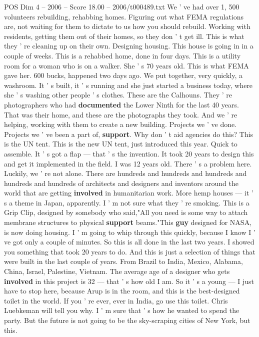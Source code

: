 \begin{textsample}{POS Dim 4 – 2006 – Score 18.00 – 2006/t000489.txt}
We ' ve had over 1, 500 volunteers rebuilding, rehabbing homes.
Figuring out what FEMA regulations are, not waiting for them to dictate to us how you should rebuild.
Working with residents, getting them out of their homes, so they don ' t get ill.
This is what they ' re cleaning up on their own.
Designing housing.
This house is going in in a couple of weeks.
This is a rehabbed home, done in four days.
This is a utility room for a woman who is on a walker.
She ' s 70 years old.
This is what FEMA gave her. 600 bucks, happened two days ago.
We put together, very quickly, a washroom.
It ' s built, it ' s running and she just started a business today, where she ' s washing other people ' s clothes.
These are the Calhouns.
They ' re photographers who had \textbf{documented} the Lower Ninth for the last 40 years.
That was their home, and these are the photographs they took.
And we ' re helping, working with them to create a new building.
Projects we ' ve done.
Projects we ' ve been a part of, \textbf{support}.
Why don ' t aid agencies do this?
This is the UN tent.
This is the new UN tent, just introduced this year.
Quick to assemble.
It ' s got a flap — that ' s the invention.
It took 20 years to design this and get it implemented in the field.
I was 12 years old.
There ' s a problem here.
Luckily, we ' re not alone.
There are hundreds and hundreds and hundreds and hundreds and hundreds of architects and designers and inventors around the world that are getting \textbf{involved} in humanitarian work.
More hemp houses — it ' s a theme in Japan, apparently.
I ' m not sure what they ' re smoking.
This is a Grip Clip, designed by somebody who said,"All you need is some way to attach membrane structures to physical \textbf{support} beams."This \textbf{guy} designed for NASA, is now doing housing.
I ' m going to whip through this quickly, because I know I ' ve got only a couple of minutes.
So this is all done in the last two years.
I showed you something that took 20 years to do.
And this is just a selection of things that were built in the last couple of years.
From Brazil to India, Mexico, Alabama, China, Israel, Palestine, Vietnam.
The average age of a designer who gets \textbf{involved} in this project is 32 — that ' s how old I am.
So it ' s a young — I just have to stop here, because Arup is in the room, and this is the best-designed toilet in the world.
If you ' re ever, ever in India, go use this toilet.
Chris Luebkeman will tell you why.
I ' m sure that ' s how he wanted to spend the party.
But the future is not going to be the sky-scraping cities of New York, but this.

\end{textsample}
